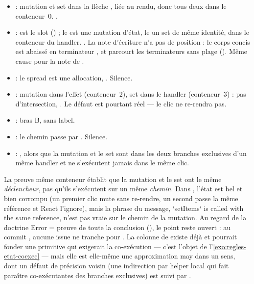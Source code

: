 \begin{itemize}
  \item {} : mutation et set dans la flèche , liée au rendu, donc tous deux dans le conteneur~0. \Error.
  \item {} :  est le slot () ; le  est une mutation d'état, le  un set de même identité, dans le conteneur du handler. \Error. La note d'écriture n'a pas de position : le corps concis  est abaissé en terminateur , et  parcourt les terminateurs sans plage (). Même cause pour la note de .
  \item {} : le spread est une allocation, . Silence.
  \item {} : mutation dans l'effet (conteneur~2), set dans le handler (conteneur~3) : pas d'intersection, \Warning. Le défaut est pourtant réel --- le clic ne re-rendra pas.
  \item {} : bras B, \Warning{} sans label.
  \item {} : le chemin passe par . Silence.
  \item {} : \Error, alors que la mutation et le set sont dans les deux branches exclusives d'un même handler et ne s'exécutent jamais dans le même clic.
\end{itemize}

\begin{piege}
La preuve \og même conteneur\fg{} établit que la mutation et le set ont le même \emph{déclencheur}, pas qu'ils s'exécutent sur un même \emph{chemin}. Dans , l'état est bel et bien corrompu (un premier clic mute sans re-rendre, un second passe la même référence et React l'ignore), mais la phrase du message, \og `setItems` is called with the same reference\fg{}, n'est pas vraie sur le chemin de la mutation. Au regard de la doctrine \og Error = preuve de toute la conclusion\fg{} (), le point reste ouvert : au commit \snapshotCommit, aucune issue ne tranche  pour . La colonne  de  existe déjà et pourrait fonder une primitive qui exigerait la co-exécution --- c'est l'objet de l'\cref{exo:regles-etat-coexec} --- mais elle est elle-même une approximation may dans un sens, dont un défaut de précision voisin (une indirection par helper local qui fait paraître co-exécutantes des branches exclusives) est suivi par .
\end{piege}


